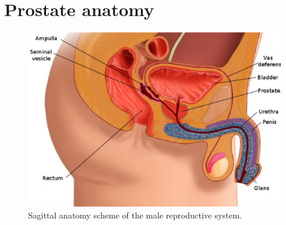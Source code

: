 
\section{Prostate anatomy}\label{section:intro:anatomy}

\begin{figure}
\centering
\includegraphics[height=0.25\textheight]{1_introduction/figures/anatomy/prostate2D.eps}
\caption[Sagittal anatomy of prostate.]{Sagittal anatomy scheme of the male reproductive system.}
\label{fig:prostatelocation}
\end{figure}

